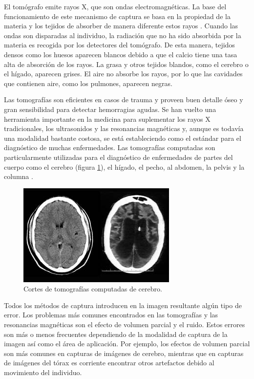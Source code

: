 El tomógrafo emite rayos X, que son ondas electromagnéticas. La base del funcionamiento de este mecanismo de captura se basa en la propiedad de la materia y los tejidos de absorber de manera diferente estos rayos \citep{prince2006medical}.
Cuando las ondas son disparadas al individuo, la radiación que no ha sido absorbida por la materia es recogida por los detectores del tomógrafo. De esta manera, tejidos densos como los huesos aparecen blancos debido a que el calcio tiene una tasa alta de absorción de los rayos. La grasa y otros tejidos blandos, como el cerebro o el hígado, aparecen grises. El aire no absorbe los rayos, por lo que las cavidades que contienen aire, como los pulmones, aparecen negras.

Las tomografías son eficientes en casos de trauma y proveen buen detalle óseo y gran sensibilidad para detectar hemorragias agudas. Se han vuelto una herramienta importante en la medicina para suplementar los rayos X tradicionales, los ultrasonidos y las resonancias magnéticas y, aunque es todavía una modalidad bastante costosa, se está estableciendo como el estándar para el diagnóstico de muchas enfermedades. Las tomografías computadas son particularmente utilizadas para el diagnóstico de enfermedades de partes del cuerpo como el cerebro (figura \ref{fig:tomografia_cerebral}), el hígado, el pecho, al abdomen, la pelvis y la columna \citep{sharma2010automated}.

\begin{figure}[H]
\centering
\includegraphics[scale=1]{images/Schiavo_catscan.jpg}
\caption{Cortes de tomografías computadas de cerebro.}
\label{fig:tomografia_cerebral}
\end{figure}

Todos los métodos de captura introducen en la imagen resultante algún tipo de error. Los problemas más comunes encontrados en las tomografías y las resonancias magnéticas son el efecto de volumen parcial y el ruido. Estos errores son más o menos frecuentes dependiendo de la modalidad de captura de la imagen así como el área de aplicación. Por ejemplo, los efectos de volumen parcial son más comunes en capturas de imágenes de cerebro, mientras que en capturas de imágenes del tórax es corriente encontrar otros artefactos debido al movimiento del individuo.

